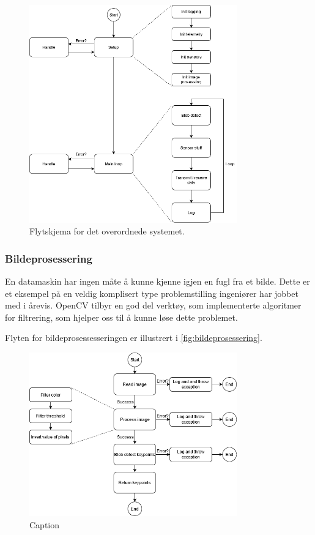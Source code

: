 \begin{figure}[H]
    \centering
    \includegraphics[width=0.8\textwidth]{implementering/hovedprogram.png}
    \caption{Flytskjema for det overordnede systemet.}
    \label{fig:hovedprogram}
\end{figure}

\subsubsection{Bildeprosessering}

En datamaskin har ingen måte å kunne kjenne igjen en fugl fra et bilde. Dette er et eksempel på en veldig komplisert type problemstilling ingeniører har jobbet med i årevis. OpenCV tilbyr en god del verktøy, som implementerte algoritmer for filtrering, som hjelper oss til å kunne løse dette problemet. 

Flyten for bildeprosessesseringen er illustrert i \autoref{fig:bildeprosessering}.  

\begin{figure}[H]
    \centering
    \includegraphics[width=0.8\textwidth]{implementering/bildeprosessering.png}
    \caption{Caption}
    \label{fig:bildeprosessering}
\end{figure} 

